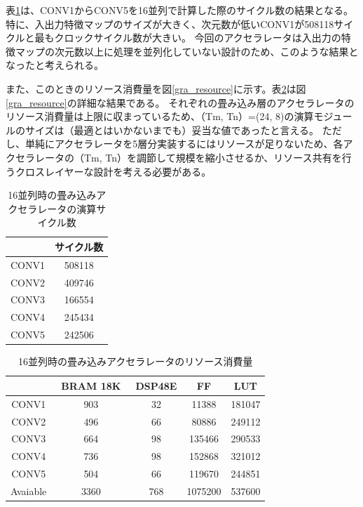 表\ref{cnnexe}は、CONV1からCONV5を16並列で計算した際のサイクル数の結果となる。
特に、入出力特徴マップのサイズが大きく、次元数が低いCONV1が508118サイクルと最もクロックサイクル数が大きい。
今回のアクセラレータは入出力の特徴マップの次元数以上に処理を並列化していない設計のため、このような結果となったと考えられる。

また、このときのリソース消費量を図\ref{gra_resource}に示す。表\ref{resource}は図\ref{gra_resource}の詳細な結果である。
それぞれの畳み込み層のアクセラレータのリソース消費量は上限に収まっているため、（Tm, Tn）=(24, 8)の演算モジュールのサイズは（最適とはいかないまでも）妥当な値であったと言える。
ただし、単純にアクセラレータを5層分実装するにはリソースが足りないため、各アクセラレータの（Tm, Tn）を調節して規模を縮小させるか、リソース共有を行うクロスレイヤーな設計を考える必要がある。

\begin{table}[ht]
 \begin{center}
  \caption{16並列時の畳み込みアクセラレータの演算サイクル数}
   \begin{tabular}{|c|c|} \hline
     & サイクル数 \\ \hline
     CONV1 & 508118 \\
     CONV2 & 409746 \\
     CONV3 & 166554 \\
     CONV4 & 245434 \\
     CONV5 & 242506 \\ \hline
  \end{tabular}
  \label{cnnexe}  
 \end{center}
\end{table}

\begin{table}[ht]
 \begin{center}
  \caption{16並列時の畳み込みアクセラレータのリソース消費量}
   \begin{tabular}{|c|c|c|c|c|} \hline
     & BRAM 18K　& DSP48E & FF & LUT \\ \hline
     CONV1 & 903 & 32 & 11388 & 181047 \\
     CONV2 & 496 & 66 & 80886 & 249112 \\
     CONV3 & 664 & 98 & 135466 & 290533 \\
     CONV4 & 736 & 98 & 152868 & 321012 \\
     CONV5 & 504 & 66 & 119670 & 244851 \\ \hline
     Avaiable & 3360 & 768 & 1075200 & 537600 \\ \hline
  \end{tabular}
  \label{resource}  
 \end{center}
\end{table}

